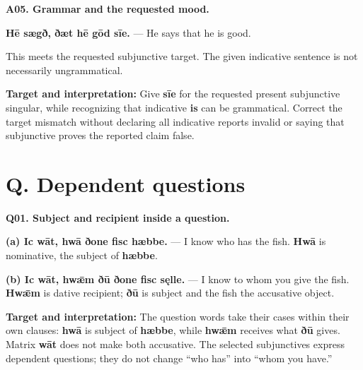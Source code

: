 \par\begin{minipage}{\linewidth}\raggedright
\textbf{A05. Grammar and the requested mood.}

\textbf{Hē sægð, ðæt hē gōd sīe.} — He says that he is good.

This meets the requested subjunctive target. The given indicative sentence is not necessarily ungrammatical.

\textbf{Target and interpretation:} Give \textbf{sīe} for the requested present subjunctive singular, while recognizing that indicative \textbf{is} can be grammatical. Correct the target mismatch without declaring all indicative reports invalid or saying that subjunctive proves the reported claim false.

\end{minipage}\par\addvspace{4pt}

\section*{Q. Dependent questions}

\par\begin{minipage}{\linewidth}\raggedright
\textbf{Q01. Subject and recipient inside a question.}

\textbf{(a) Ic wāt, hwā ðone fisc hæbbe.} — I know who has the fish. \textbf{Hwā} is nominative, the subject of \textbf{hæbbe}.

\textbf{(b) Ic wāt, hwǣm ðū ðone fisc sęlle.} — I know to whom you give the fish. \textbf{Hwǣm} is dative recipient; \textbf{ðū} is subject and the fish the accusative object.

\textbf{Target and interpretation:} The question words take their cases within their own clauses: \textbf{hwā} is subject of \textbf{hæbbe}, while \textbf{hwǣm} receives what \textbf{ðū} gives. Matrix \textbf{wāt} does not make both accusative. The selected subjunctives express dependent questions; they do not change “who has” into “whom you have.”

\end{minipage}\par\addvspace{4pt}

